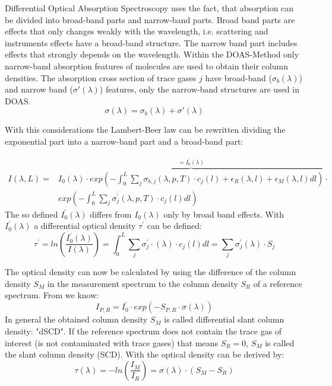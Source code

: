 \documentclass  [
  paper    = a4,
  BCOR     = 10mm,
  twoside,
  fontsize = 12pt,
  fleqn,
  toc      = bibnumbered,
  toc      = listofnumbered,
  numbers  = noendperiod,
  headings = normal,
  listof   = leveldown,
  version  = 3.03
]                                       {scrreprt}
\begin{document}
	Differential Optical Absorption Spectroscopy uses the fact, that absorption can be divided into broad-band parts and narrow-band parts. Broad band parts are effects that only changes weakly with the wavelength,  i.e. scattering and instruments effects have a broad-band structure. 
	The narrow band part includes effects that strongly depends on the wavelength.
	Within the DOAS-Method only narrow-band absorption features of molecules are used to obtain their column densities.
	The absorption cross section of trace gases $j$ have broad-band ($\sigma_b\left(\lambda \right)$) and narrow band ($\sigma{'}\left(\lambda \right)$) features, only the narrow-band structures are used in DOAS.
	\begin{equation}
	\sigma\left(\lambda \right) = \sigma_b\left(\lambda \right) + \sigma{'}\left(\lambda \right)
	\end{equation}

	With this considerations the Lambert-Beer law  can be rewritten
	dividing the exponential part into a narrow-band part and a broad-band part:

	\begin{align}
	I\left(\lambda,L\right) = &\overbrace{I_{0}\left(\lambda\right)\cdot exp\left(-\int^{L}_{0}\sum_{j}\sigma_{b,j}\left(\lambda,p,T\right)\cdot c_{j}\left(l\right)+\epsilon_R\left(\lambda,l\right)+\epsilon_{M}\left(\lambda,l\right)dl\right)}^{=I^{'}_0\left(\lambda\right)} \cdot \nonumber \\
	&exp\left(-\int^{L}_{0}\sum_{j}\sigma_{j}^{'}\left(\lambda,p,T\right)\cdot c_{j}\left(l\right)dl\right)
	\label{eq:bb}
	\end{align}	
	The so defined $I^{'}_0\left(\lambda\right)$ differs from $I_0\left(\lambda\right)$ only by broad band effects. With $I^{'}_0\left(\lambda\right)$ a differential optical density $\tau^{'}$ can be defined:
	\begin{equation}
	\tau^{'} = ln\left(\frac{I^{'}_0\left(\lambda\right)}{I\left(\lambda\right)}\right) = \int_{0}^{L} \sum_{j} \sigma^{'}_{j} \cdot \left(\lambda\right) \cdot c_{j}\left(l\right)dl = \sum_{j}\sigma^{'}_{j}\left(\lambda\right)\cdot S_{j}
	\label{eq:taustrich}
	\end{equation}
	
	The optical density can now be calculated by using the difference of the column density $S_{M}$ in the measurement spectrum to the column density $S_{R}$ of a reference spectrum. From  we know:	
	\begin{equation}
	I_{P,R} = I^{'}_{0}\cdot exp\left(-S_{P,R}\cdot\sigma\left(\lambda\right)\right)
	\label{eq:smr}
	\end{equation}
	In general the obtained column density $S_{M}$ is called differential slant column density: "dSCD". If the reference spectrum does not contain the trace gas of interest (is not contaminated with trace gases) that means $S_{R} = 0$, $S_{M}$ is called the slant column	density (SCD). 
	With  the optical density can be derived by:
	\begin{equation}
	\tau\left(\lambda\right) = -ln\left(\frac{I_{M}}{I_{R}}\right) = \sigma\left(\lambda\right)\cdot\left(S_{M}-S_{R}\right)
	\end{equation}
	
\end{document}
